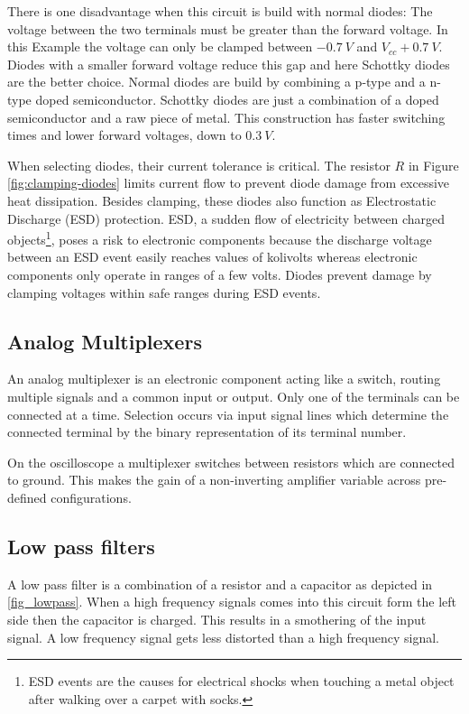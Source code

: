 There is one disadvantage when this circuit is build with normal diodes: The voltage between the two terminals must be greater than the forward voltage. In this Example the voltage can only be clamped between $\SI{-0,7}{V}$ and $V_{cc} + \SI{0,7}{V}$. Diodes with a smaller forward voltage reduce this gap and here Schottky diodes are the better choice. Normal diodes are build by combining a p-type and a n-type doped semiconductor. Schottky diodes are just a combination of a doped semiconductor and a raw piece of metal. This construction has faster switching times and lower forward voltages, down to $\SI{0,3}{V}$.

When selecting diodes, their current tolerance is critical. The resistor $R$ in Figure \ref{fig:clamping-diodes} limits current flow to prevent diode damage from excessive heat dissipation. Besides clamping, these diodes also function as Electrostatic Discharge (ESD) protection. ESD, a sudden flow of electricity between charged objects\footnote{ESD events are the causes for electrical shocks when touching a metal object after walking over a carpet with socks.}, poses a risk to electronic components because the discharge voltage between an ESD event easily reaches values of kolivolts whereas electronic components only operate in ranges of a few volts. Diodes prevent damage by clamping voltages within safe ranges during ESD events.

\subsection{Analog Multiplexers}

An analog multiplexer is an electronic component acting like a switch, routing multiple signals and a common input or output. Only one of the terminals can be connected at a time. Selection occurs via input signal lines which determine the connected terminal by the binary representation of its terminal number.

On the oscilloscope a multiplexer switches between resistors which are connected to ground. This makes the gain of a non-inverting amplifier variable across pre-defined configurations.

\subsection{Low pass filters}

A low pass filter is a combination of a resistor and a capacitor as depicted in \cref{fig_lowpass}. When a high frequency signals comes into this circuit form the left side then the capacitor is charged. This results in a smothering of the input signal. A low frequency signal gets less distorted than a high frequency signal.


